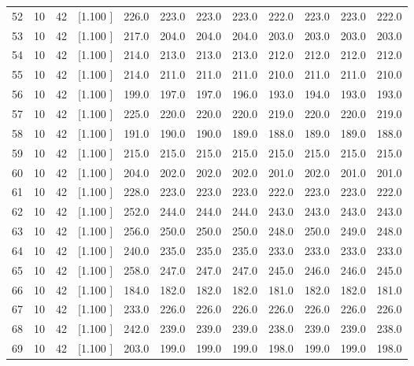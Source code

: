 \documentclass[12pt,a4paper]{article}
\begin{document}
\begin{center}
{\begin{tabular}{r r r r r r r r r r r r}
  52& 10& 42&[1.100     ]&   226.0&   223.0&   223.0&   223.0&   222.0&   223.0&   223.0&   222.0\\[-0.02in]
  53& 10& 42&[1.100     ]&   217.0&   204.0&   204.0&   204.0&   203.0&   203.0&   203.0&   203.0\\[-0.02in]
  54& 10& 42&[1.100     ]&   214.0&   213.0&   213.0&   213.0&   212.0&   212.0&   212.0&   212.0\\[-0.02in]
  55& 10& 42&[1.100     ]&   214.0&   211.0&   211.0&   211.0&   210.0&   211.0&   211.0&   210.0\\[-0.02in]
  56& 10& 42&[1.100     ]&   199.0&   197.0&   197.0&   196.0&   193.0&   194.0&   193.0&   193.0\\[-0.02in]
  57& 10& 42&[1.100     ]&   225.0&   220.0&   220.0&   220.0&   219.0&   220.0&   220.0&   219.0\\[-0.02in]
  58& 10& 42&[1.100     ]&   191.0&   190.0&   190.0&   189.0&   188.0&   189.0&   189.0&   188.0\\[-0.02in]
  59& 10& 42&[1.100     ]&   215.0&   215.0&   215.0&   215.0&   215.0&   215.0&   215.0&   215.0\\[-0.02in]
  60& 10& 42&[1.100     ]&   204.0&   202.0&   202.0&   202.0&   201.0&   202.0&   201.0&   201.0\\[-0.02in]
  61& 10& 42&[1.100     ]&   228.0&   223.0&   223.0&   223.0&   222.0&   223.0&   223.0&   222.0\\[-0.02in]
  62& 10& 42&[1.100     ]&   252.0&   244.0&   244.0&   244.0&   243.0&   243.0&   243.0&   243.0\\[-0.02in]
  63& 10& 42&[1.100     ]&   256.0&   250.0&   250.0&   250.0&   248.0&   250.0&   249.0&   248.0\\[-0.02in]
  64& 10& 42&[1.100     ]&   240.0&   235.0&   235.0&   235.0&   233.0&   233.0&   233.0&   233.0\\[-0.02in]
  65& 10& 42&[1.100     ]&   258.0&   247.0&   247.0&   247.0&   245.0&   246.0&   246.0&   245.0\\[-0.02in]
  66& 10& 42&[1.100     ]&   184.0&   182.0&   182.0&   182.0&   181.0&   182.0&   182.0&   181.0\\[-0.02in]
  67& 10& 42&[1.100     ]&   233.0&   226.0&   226.0&   226.0&   226.0&   226.0&   226.0&   226.0\\[-0.02in]
  68& 10& 42&[1.100     ]&   242.0&   239.0&   239.0&   239.0&   238.0&   239.0&   239.0&   238.0\\[-0.02in]
  69& 10& 42&[1.100     ]&   203.0&   199.0&   199.0&   199.0&   198.0&   199.0&   199.0&   198.0\\[-0.02in]

\end{tabular}}
\end{center}
\end{document}
